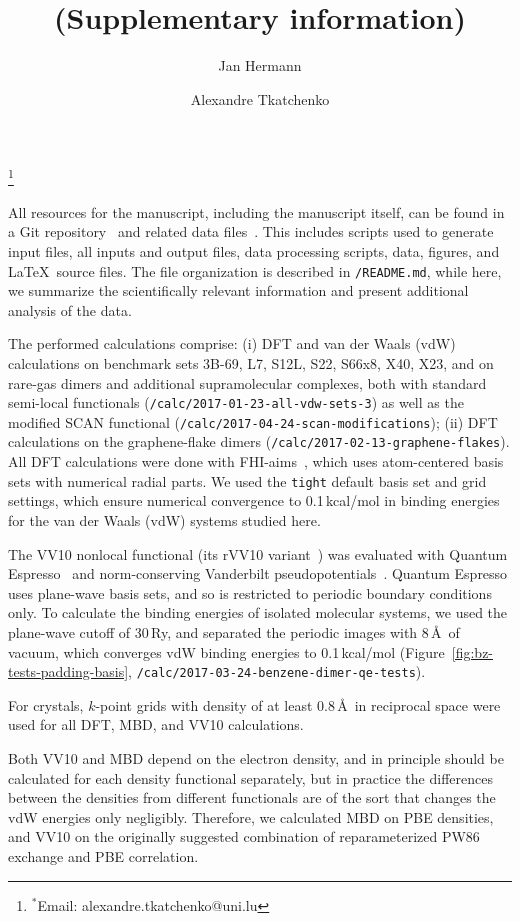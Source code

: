 \documentclass[twocolumn]{article}
\title{\\(Supplementary information)}
\author[1,2]{Jan Hermann}
\author[2,*]{Alexandre Tkatchenko}
\affil[1]{Fritz-Haber-Institut der Max-Planck-Gesellschaft, Faradayweg 4--6, 14195 Berlin, Germany}
\affil[2]{Physics and Materials Science Research Unit, University of Luxembourg, 162A Avenue de la Faïencerie, L-1511 Luxembourg}
\date{}
\renewcommand\cite{\citep}
\begin{document}
\nocite{achemso-control}

\maketitle

\begingroup
\renewcommand\thefootnote{}\footnote{$^*$Email: alexandre.tkatchenko@uni.lu}%
\addtocounter{footnote}{-1}%
\endgroup
All resources for the manuscript, including the manuscript itself, can be found in a Git repository~\cite{GitRepo} and related data files~\cite{DataH5,DataCaf}.
This includes scripts used to generate input files, all inputs and output files, data processing scripts, data, figures, and \LaTeX\ source files.
The file organization is described in \verb+/README.md+, while here, we summarize the scientifically relevant information and present additional analysis of the data.

The performed calculations comprise:
(i) DFT and van der Waals (vdW) calculations on benchmark sets 3B-69, L7, S12L, S22, S66x8, X40, X23, and on rare-gas dimers and additional supramolecular complexes, both with standard semi-local functionals (\verb+/calc/2017-01-23-all-vdw-sets-3+) as well as the modified SCAN functional (\verb+/calc/2017-04-24-scan-modifications+);
(ii) DFT calculations on the graphene-flake dimers (\verb+/calc/2017-02-13-graphene-flakes+).
All DFT calculations were done with FHI-aims~\cite{BlumCPC09}, which uses atom-centered basis sets with numerical radial parts.
We used the \verb+tight+ default basis set and grid settings, which ensure numerical convergence to 0.1\,kcal/mol in binding energies for the van der Waals (vdW) systems studied here.

The VV10 nonlocal functional (its rVV10 variant~\cite{SabatiniPRB13}) was evaluated with Quantum Espresso~\cite{GiannozziJPCM09} and norm-conserving Vanderbilt pseudopotentials~\cite{HamannPRB13}.
Quantum Espresso uses plane-wave basis sets, and so is restricted to periodic boundary conditions only.
To calculate the binding energies of isolated molecular systems, we used the plane-wave cutoff of 30\,Ry, and separated the periodic images with 8\,\AA\ of vacuum, which converges vdW binding energies to 0.1\,kcal/mol (Figure~\ref{fig:bz-tests-padding-basis}, \verb+/calc/2017-03-24-benzene-dimer-qe-tests+).

For crystals, $k$-point grids with density of at least 0.8\,\AA\ in reciprocal space were used for all DFT, MBD, and VV10 calculations.

Both VV10 and MBD depend on the electron density, and in principle should be calculated for each density functional separately, but in practice the differences between the densities from different functionals are of the sort that changes the vdW energies only negligibly.
Therefore, we calculated MBD on PBE densities, and VV10 on the originally suggested combination of reparameterized PW86 exchange and PBE correlation.
\end{document}
